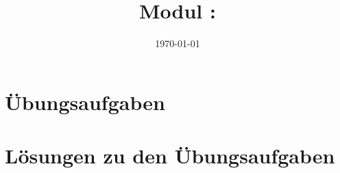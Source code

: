 \documentclass[twoside, a4paper]{article}
\title{Modul \GetItDigitalModulnumber: \GetItDigitalModulname}
\author{}
\institute{GET it digital}
\date{\today}
\begin{document}

{\setlength{\parskip}{0.05ex}    %
	\tableofcontents
	\newpage
}

\printnomenclature
\cleardoublepage

\pagestyle{fancyplain}
\setheadkapitel

\cleardoublepage




\cleardoublepage
\appendix
\setheadanhang

\section{Übungsaufgaben}
\renewcommand{\Aufgabe}[1]{#1}
\renewcommand{\Loesung}[1]{}


\clearpage
\section{Lösungen zu den Übungsaufgaben}
\renewcommand{\Aufgabe}[1]{}
\renewcommand{\Loesung}[1]{#1}


\clearpage
{}
\printbibliography

\clearpage
{}
\printindex
\end{document}
